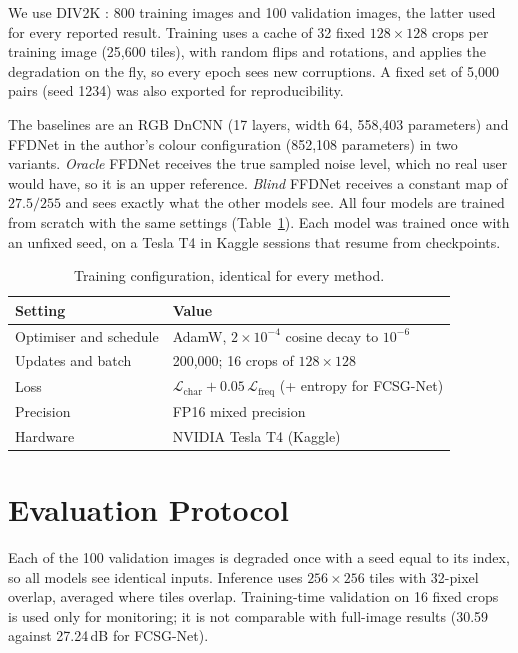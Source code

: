 \documentclass[12pt,a4paper,oneside]{NITR}
\newcommand{\fcsg}{FCSG-Net}
\newcommand{\dB}{\,dB}
\begin{document}
We use DIV2K \cite{agustsson2017div2k}: 800 training images and 100
validation images, the latter used for every reported result. Training uses
a cache of 32 fixed $128\times128$ crops per training image (25,600 tiles),
with random flips and rotations, and applies the degradation on the fly, so
every epoch sees new corruptions. A fixed set of 5,000 pairs (seed 1234) was
also exported for reproducibility.

The baselines are an RGB DnCNN (17 layers, width 64, 558,403 parameters) and
FFDNet in the author's colour configuration (852,108 parameters) in two
variants. \emph{Oracle} FFDNet receives the true sampled noise level, which
no real user would have, so it is an upper reference. \emph{Blind} FFDNet
receives a constant map of $27.5/255$ and sees exactly what the other models
see. All four models are trained from scratch with the same settings
(Table~\ref{tab:hparams}). Each model was trained once with an unfixed seed,
on a Tesla T4 in Kaggle sessions that resume from checkpoints.

\begin{table}[htbp]
	\centering
	\caption{Training configuration, identical for every method.}
	\label{tab:hparams}
	\small
	\begin{tabular}{@{}ll@{}}
		\toprule
		Setting & Value \\
		\midrule
		Optimiser and schedule & AdamW, $2\times10^{-4}$ cosine decay to $10^{-6}$ \\
		Updates and batch      & 200,000; 16 crops of $128\times128$ \\
		Loss                   & $\mathcal{L}_\text{char}+0.05\,\mathcal{L}_\text{freq}$ (+ entropy for \fcsg{}) \\
		Precision              & FP16 mixed precision \\
		Hardware               & NVIDIA Tesla T4 (Kaggle) \\
		\bottomrule
	\end{tabular}
\end{table}

\section{Evaluation Protocol}\label{sec:evalproto}

Each of the 100 validation images is degraded once with a seed equal to its
index, so all models see identical inputs. Inference uses $256\times256$
tiles with 32-pixel overlap, averaged where tiles overlap. Training-time
validation on 16 fixed crops is used only for monitoring; it is not
comparable with full-image results (30.59 against 27.24\dB{} for \fcsg{}).
\end{document}
